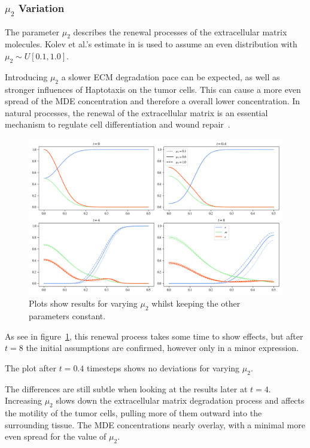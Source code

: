 \subsubsection*{$\mu_2$ Variation}
The parameter $\mu_2$ describes the renewal processes of the extracellular matrix molecules. Kolev et al.'s estimate in \cite{Kolev2010} is used to assume an even distribution with $\mu_2 \sim U[0.1, 1.0]$. 

Introducing $\mu_2$ a slower ECM degradation pace can be expected, as well as stronger influences of Haptotaxis on the tumor cells. This can cause a more even spread of the MDE concentration and therefore a overall lower concentration.
In natural processes, the renewal of the extracellular matrix is an essential mechanism to regulate cell differentiation and wound repair~\cite{Lu2011-yt}.
\begin{figure}[h!]
 \centering
 \includegraphics[width=\textwidth]{resources/images/prolif_mu_2_variation.png}
 \caption{Plots show results for varying $\mu_2$ whilst keeping the other parameters constant.}
 \label{fig:prolif_mu_2_variation}
\end{figure}
As see in figure~\ref{fig:prolif_mu_2_variation}, this renewal process takes some time to show effects, but after $t=8$ the initial assumptions are confirmed, however only in a minor expression. 

The plot after $t=0.4$ timesteps shows no deviations for varying $\mu_2$.

The differences are still subtle when looking at the results later at $t=4$. Increasing $\mu_2$ slows down the extracellular matrix degradation process and affects the motility of the tumor cells, pulling more of them outward into the surrounding tissue. The MDE concentrations nearly overlay, with a minimal more even spread for the value of $\mu_2$.

